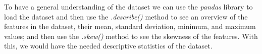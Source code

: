 To have a general understanding of the dataset we can use the \textit{pandas} library to load the dataset and then use the \textit{.describe()} method to see an overview of the features in the dataset, their mean, standard deviation, minimum, and maximum values; and then use the \textit{.skew()} method to see the skewness of the features. With this, we would have the needed descriptive statistics of the dataset.
